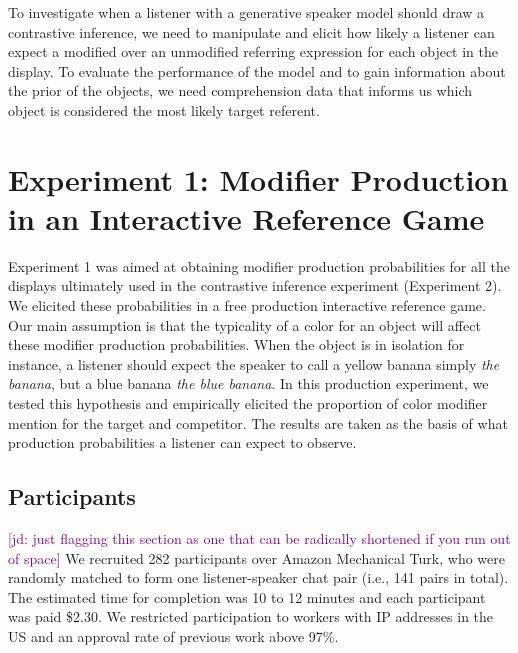 \documentclass[10pt,letterpaper]{article}
\newcommand{\ek}[1]{\textcolor{Orange}{[ek: #1]}}
\newcommand{\jd}[1]{\textcolor{Purple}{[jd: #1]}}
\begin{document}


To investigate when a listener with a generative speaker model should draw a contrastive inference, we need to manipulate and elicit how likely a listener can expect a modified over an unmodified referring expression for each object in the display. To evaluate the performance of the model and to gain information about the prior of the objects, we need comprehension data that informs us which object is considered the most likely target referent.


\section{Experiment 1: Modifier Production in an Interactive Reference Game}

Experiment 1 was aimed at obtaining modifier production probabilities for all the displays ultimately used in the contrastive inference  experiment (Experiment 2). We elicited these probabilities in a free production interactive reference game. Our main assumption is that the typicality of a color for an object will affect these modifier production probabilities. When the object is in isolation for instance, a listener should expect the speaker to call a yellow banana simply \textit{the banana}, but a blue banana \textit{the blue banana}. In this production experiment, we tested this hypothesis and empirically elicited the proportion of color modifier mention for the target and competitor. The results are taken as the basis of what production probabilities a listener can expect to observe.


\subsection{Participants}
\jd{just flagging this section as one that can be radically shortened if you run out of space}
We recruited 282 participants over Amazon Mechanical Turk, who were randomly matched to form one listener-speaker chat pair (i.e., 141 pairs in total). 
The estimated time for completion was 10 to 12 minutes and each participant was paid \$2.30. We restricted participation to workers with IP addresses in the US and an approval rate of previous work above 97\%.
\end{document}
